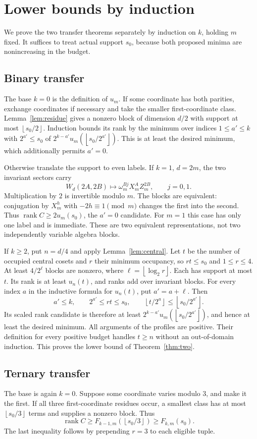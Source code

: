 \documentclass[11pt,a4paper]{article}
\theoremstyle{remark}\newtheorem{remark}[theorem]{Remark}
\DeclareMathOperator{\rank}{rank}
\newcommand{\fl}[1]{\left\lfloor #1\right\rfloor}
\begin{document}
\section{Lower bounds by induction}
We prove the two transfer theorems separately by induction on $k$,
holding $m$ fixed. It suffices to treat actual support $s_0$, because
both proposed minima are nonincreasing in the budget.

\subsection{Binary transfer}
The base $k=0$ is the definition of $u_m$. If some coordinate has both
parities, exchange coordinates if necessary and take the smaller
first-coordinate class. Lemma~\ref{lem:residue} gives a nonzero block
of dimension $d/2$ with support at most $\fl{s_0/2}$. Induction bounds its
rank by the minimum over indices $1\le a'\le k$ with $2^{a'}\le s_0$ of
$2^{k-a'}u_m(\fl{s_0/2^{a'}})$. This is at least the desired minimum,
which additionally permits $a'=0$.

Otherwise translate the support to even labels. If $k=1$, $d=2m$,
the two invariant sectors carry
\[
 W_d(2A,2B)\mapsto \omega_m^{Bj}X_m^AZ_m^{2B},
 \qquad j=0,1.
\]
Multiplication by $2$ is invertible modulo $m$. The blocks are equivalent:
conjugation by $X_m^h$ with $-2h\equiv1\pmod m$ changes the first into
the second. Thus $\rank C\ge2u_m(s_0)$, the $a'=0$ candidate.
For $m=1$ this case has only one label and is immediate.
These are two equivalent representations, not two independently
variable algebra blocks.

If $k\ge2$, put $n=d/4$ and apply Lemma~\ref{lem:central}.
Let $t$ be the number of occupied central cosets and $r$ their minimum
occupancy, so $rt\le s_0$ and $1\le r\le4$.
At least $4/2^\ell$ blocks are nonzero, where $\ell=\fl{\log_2r}$.
Each has support at most $t$. Its rank is at least $u_n(t)$, and ranks
add over invariant blocks. For every index $a$ in the inductive formula
for $u_n(t)$, put $a'=a+\ell$. Then
\[
 a'\le k,\qquad 2^{a'}\le rt\le s_0,\qquad
 \fl{t/2^a}\le\fl{s_0/2^{a'}} .
\]
Its scaled rank candidate is therefore at least
$2^{k-a'}u_m(\fl{s_0/2^{a'}})$, and hence at least the desired minimum.
All arguments of the profiles are positive. Their definition for every
positive budget handles $t\ge n$ without an out-of-domain induction.
This proves the lower bound of Theorem~\ref{thm:two}.

\subsection{Ternary transfer}
The base is again $k=0$. Suppose some coordinate varies modulo $3$,
and make it the first. If all three first-coordinate residues occur,
a smallest class has at most $\fl{s_0/3}$ terms and supplies a nonzero
block. Thus
\[
 \rank C\ge F_{k-1,m}(\fl{s_0/3})\ge F_{k,m}(s_0).
\]
The last inequality follows by prepending $r=3$ to each eligible tuple.
\end{document}

